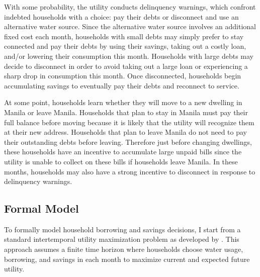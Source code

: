 \documentclass[12pt,table]{article}
\begin{document}
With some probability, the utility conducts delinquency warnings, which confront indebted households with a choice: pay their debts or disconnect and use an alternative water source.  Since the alternative water source involves an additional fixed cost each month, households with small debts may simply prefer to stay connected and pay their debts by using their savings, taking out a costly loan, and/or lowering their consumption this month.  Households with large debts may decide to disconnect in order to avoid taking out a large loan or experiencing a sharp drop in consumption this month.  Once disconnected, households begin accumulating savings to eventually pay their debts and reconnect to service.

At some point, households learn whether they will move to a new dwelling in Manila or leave Manila.  Households that plan to stay in Manila must pay their full balance before moving because it is likely that the utility will recognize them at their new address.  Households that plan to leave Manila do not need to pay their outstanding debts before leaving.  Therefore just before changing dwellings, these households have an incentive to accumulate large unpaid bills since the utility is unable to collect on these bills if households leave Manila.  In these months, households may also have a strong incentive to disconnect in response to delinquency warnings.

\subsection{Formal Model}

To formally model household borrowing and savings decisions, I start from a standard intertemporal utility maximization problem as developed by \cite{deaton1991saving}.  This approach assumes a finite time horizon where households choose water usage, borrowing, and savings in each month to maximize current and expected future utility.  
\end{document}
